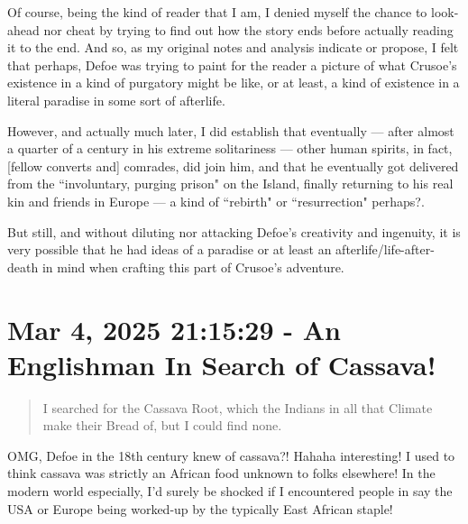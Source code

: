 \documentclass[a4paper]{article}
\begin{document}
Of course, being the kind of reader that I am, I denied myself the chance to look-ahead nor cheat by trying to find out how the story ends before actually reading it to the end. And so, as my original notes and analysis indicate or propose, I felt that perhaps, Defoe was trying to paint for the reader a picture of what Crusoe's existence in a kind of purgatory might be like, or at least, a kind of existence in a literal paradise in some sort of afterlife. 

However, and actually much later, I did establish that eventually --- after almost a quarter of a century in his extreme solitariness --- other human spirits, in fact, [fellow converts and] comrades, did join him, and that he eventually got delivered from the ``involuntary, purging prison" on the Island, finally returning to his real kin and friends in Europe --- a kind of ``rebirth" or ``resurrection" perhaps?. 

But still, and without diluting nor attacking Defoe's creativity and ingenuity, it is very possible that he had ideas of a paradise or at least an afterlife/life-after-death in mind when crafting this part of Crusoe's adventure. 





\section{Mar 4, 2025 21:15:29 - An Englishman In Search of Cassava!}
\label{SEC25}



\noindent
\begin{minipage}{1\textwidth}
\vspace{1em}
\begin{quotation}
{\ttfamily


I searched for the Cassava Root, which the Indians in all that Climate make their Bread of, but I could find none.


}
\end{quotation}
\vspace{1em}
\end{minipage}


OMG, Defoe in the 18th century knew of cassava?! Hahaha interesting! I used to think cassava was strictly an African food unknown to folks elsewhere! In the modern world especially, I'd surely be shocked if I encountered people in say the USA or Europe being worked-up by the typically East African staple!
\end{document}
